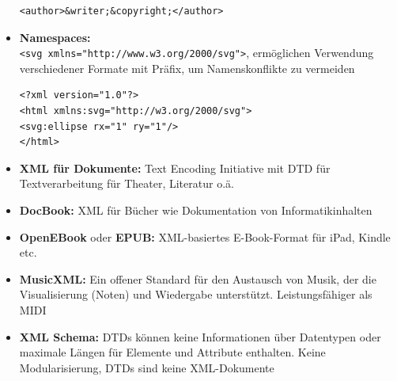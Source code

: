 \documentclass[12pt,landscape]{article}
\begin{document}
\begin{multicols}{3}
\begin{itemize}
\begin{lstlisting}
<author>&writer;&copyright;</author>
\end{lstlisting}
\item \textbf{Namespaces:}\\
\lstinline|<svg xmlns="http://www.w3.org/2000/svg">|, ermöglichen Verwendung verschiedener Formate mit Präfix, um Namenskonflikte zu vermeiden
\begin{lstlisting}
<?xml version="1.0"?>
<html xmlns:svg="http://w3.org/2000/svg">
<svg:ellipse rx="1" ry="1"/>
</html>
\end{lstlisting}
\item \textbf{XML für Dokumente:} Text Encoding Initiative mit DTD für Textverarbeitung für Theater, Literatur o.ä. 
\item \textbf{DocBook:} XML für Bücher wie Dokumentation von Informatikinhalten
\item \textbf{OpenEBook} oder \textbf{EPUB:} XML-basiertes E-Book-Format für iPad, Kindle etc.
\item \textbf{MusicXML:} Ein offener Standard für den Austausch von Musik, der die Visualisierung (Noten) und Wiedergabe unterstützt. Leistungsfähiger als MIDI
\item \textbf{XML Schema:} DTDs können keine Informationen über Datentypen oder maximale Längen für Elemente und Attribute enthalten. Keine Modularisierung, DTDs sind keine XML-Dokumente
\end{itemize}

\end{multicols}
\end{document}
